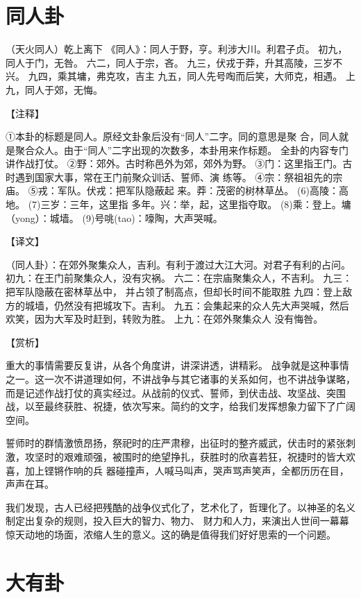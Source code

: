 \documentclass[12pt,UTF8]{ctexbook}
\begin{document}
\chapter{同人卦}

（天火同人）乾上离下
《同人》：同人于野，亨。利涉大川。利君子贞。
初九，同人于门，无咎。
六二，同人于宗，吝。
九三，伏戎于莽，升其高陵，三岁不兴。
九四，乘其墉，弗克攻，吉主
九五，同人先号啕而后笑，大师克，相遇。
上九，同人于郊，无悔。

【注释】

①本卦的标题是同人。原经文卦象后没有“同人”二字。同的意思是聚 合，同人就是聚合众人。由于“同人”二字出现的次数多，本卦用来作标题。 全卦的内容专门讲作战打仗。
②野：郊外。古时称邑外为郊，郊外为野。
③门：这里指王门。古时遇到国家大事，常在王门前聚众训话、誓师、演 练等。
④宗：祭祖祖先的宗庙。
⑤戎：军队。伏戎：把军队隐蔽起 来。莽：茂密的树林草丛。
(6)高陵：高地。
(7)三岁：三年，这里指 多年。兴：举，起，这里指夺取。
(8)乘：登上。墉（yong）：城墙。
(9)号咷(tao)：嚎陶，大声哭喊。

【译文】

（同人卦）：在郊外聚集众人，吉利。有利于渡过大江大河。对君子有利的占问。
初九：在王门前聚集众人，没有灾祸。
六二：在宗庙聚集众人，不吉利。
九三：把军队隐蔽在密林草丛中， 并占领了制高点，但却长时间不能取胜
九四：登上敌方的城墙，仍然没有把城攻下。吉利。
九五：会集起来的众人先大声哭喊，然后欢笑，因为大军及时赶到，转败为胜。
上九：在郊外聚集众人 没有悔咎。

【赏析】

重大的事情需要反复讲，从各个角度讲，讲深讲透，讲精彩。 战争就是这种事情之一。这一次不讲道理如何，不讲战争与其它诸事的关系如何，也不讲战争谋略，而是记述作战打仗的真实经过。从战前的仪式、誓师，到伏击战、攻坚战、突围战，以至最终获胜、祝捷，依次写来。简约的文字，给我们发挥想象力留下了广阔空间。

誓师时的群情激愤昂扬，祭祀时的庄严肃穆，出征时的整齐威武，伏击时的紧张刺激，攻坚时的艰难顽强，被围时的绝望挣扎，获胜时的欣喜若狂，祝捷时的皆大欢喜，加上铿锵作响的兵 器碰撞声，人喊马叫声，哭声骂声笑声，全都历历在目，声声在耳。

我们发现，古人已经把残酷的战争仪式化了，艺术化了，哲理化了。以神圣的名义制定出复杂的规则，投入巨大的智力、物力、 财力和人力，来演出人世间一幕幕惊天动地的场面，浓缩人生的意义。这的确是值得我们好好思索的一个问题。

\chapter{大有卦}
\end{document}
